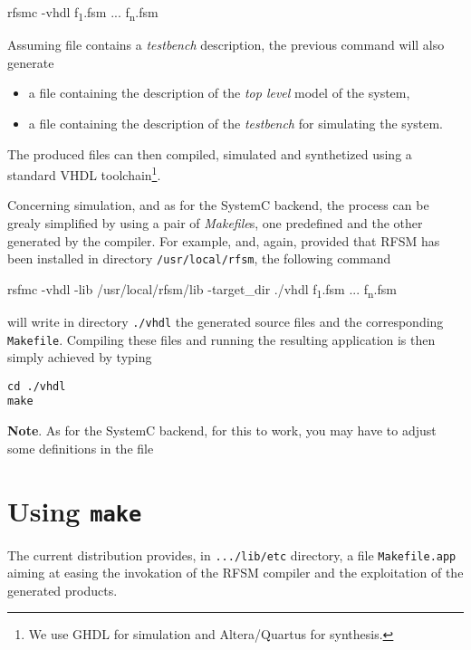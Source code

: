 \begin{FVerbatim}[commandchars=\\\{\}]
rfsmc -vhdl f\textsubscript{1}.fsm ... f\textsubscript{n}.fsm
\end{FVerbatim}

Assuming file  contains a \emph{testbench} description, the previous command will
also generate  
\begin{itemize}
\item a file  containing the description of the \emph{top level} model of the
  system,
\item a file  containing the description of the \emph{testbench} for
  simulating the system.
\end{itemize}

The produced files can then compiled, simulated and synthetized using a standard VHDL
toolchain\footnote{We use GHDL for simulation and Altera/Quartus for synthesis.}.

Concerning simulation, and as for the SystemC backend, the process can be grealy simplified by using
a pair of \emph{Makefile}s, one predefined and the other generated by the compiler.  For example,
and, again, provided that RFSM has been installed in directory \verb|/usr/local/rfsm|, the following
command

\begin{FVerbatim}[commandchars=\\\{\}]
rsfmc -vhdl -lib /usr/local/rfsm/lib -target_dir ./vhdl f\textsubscript{1}.fsm ... f\textsubscript{n}.fsm
\end{FVerbatim}

will write in directory \verb|./vhdl| the generated source files and the corresponding
\verb|Makefile|. Compiling these files and running the resulting application is then simply achieved
by typing

\begin{verbatim}
cd ./vhdl
make 
\end{verbatim}

\medskip
\textbf{Note}. As for the SystemC backend, for this to work, you may have to adjust some definitions in the file

\section{Using \texttt{make}}
\label{sec:makefile}

The current distribution provides, in \verb|.../lib/etc| directory, a file \verb|Makefile.app|
aiming at easing the invokation of the RFSM compiler and the exploitation of the generated
products.

